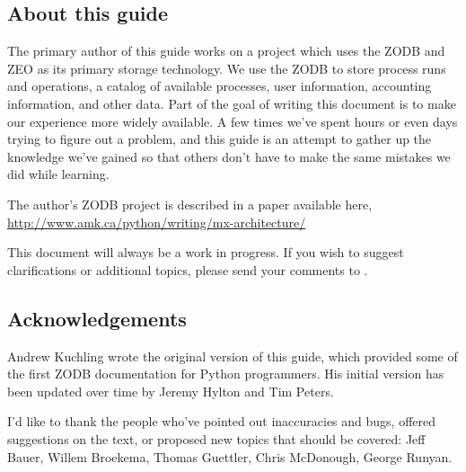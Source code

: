 \subsection{About this guide}

The primary author of this guide works on a project which uses the
ZODB and ZEO as its primary storage technology.  We use the ZODB to
store process runs and operations, a catalog of available processes,
user information, accounting information, and other data.  Part of the
goal of writing this document is to make our experience more widely
available.  A few times we've spent hours or even days trying to
figure out a problem, and this guide is an attempt to gather up the
knowledge we've gained so that others don't have to make the same
mistakes we did while learning.

The author's ZODB project is described in a paper available here,
\url{http://www.amk.ca/python/writing/mx-architecture/}

This document will always be a work in progress.  If you wish to
suggest clarifications or additional topics, please send your comments to
.

\subsection{Acknowledgements}

Andrew Kuchling wrote the original version of this guide, which
provided some of the first ZODB documentation for Python programmers.
His initial version has been updated over time by Jeremy Hylton and
Tim Peters.

I'd like to thank the people who've pointed out inaccuracies and bugs,
offered suggestions on the text, or proposed new topics that should be
covered: Jeff Bauer, Willem Broekema, Thomas Guettler,
Chris McDonough, George Runyan.
